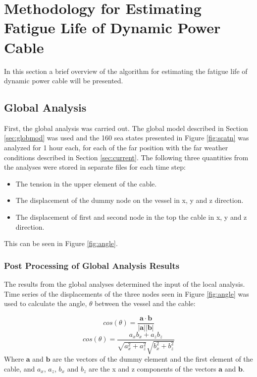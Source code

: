 \chapter{Methodology for Estimating Fatigue Life of Dynamic Power Cable }
\label{chap:estimation}
In this section a brief overview of the algorithm for estimating the fatigue life of dynamic power cable will be presented. 
\section{Global Analysis}
First, the global analysis was carried out. The global model described in Section \ref{sec:globmod} was used and the 160 sea states presented in Figure \ref{fig:scatn} was analyzed for 1 hour each, for each of the far position with the far weather conditions described in Section \ref{sec:current}. The following three quantities from the analyses were stored in separate files for each time step:
\begin{itemize}
    \item The  tension in the upper element of the cable.
    \item The displacement of the dummy node on the vessel in x, y and z direction.
    \item The  displacement of first and second node in the top the cable in x, y and z direction.
\end{itemize}
This can be seen in Figure \ref{fig:angle}.

\subsection{Post Processing of Global Analysis Results}
The results from the global analyses determined the input of the local analysis. Time series of the displacements of the three nodes seen in Figure \ref{fig:angle} was used to calculate the angle, $\theta$ between the vessel and the cable: 

\begin{equation}
    cos(\theta) = \frac{\boldsymbol{a \cdot b}}{|\boldsymbol{a}||\boldsymbol{b}| }
\end{equation}
\begin{equation}
    cos(\theta) = \frac{a_x b_x + a_z b_z}{\sqrt{a_x^2 +a_z^2}\sqrt{b_x^2 +b_z^2}}
\end{equation}
Where $\boldsymbol{a}$ and $\boldsymbol{b}$ are the vectors of the dummy element and the first element of the cable, and $a_x$, $a_z$, $b_x$ and $b_z$ are the x and z components of the vectors $\boldsymbol{a}$ and $\boldsymbol{b}$. 

